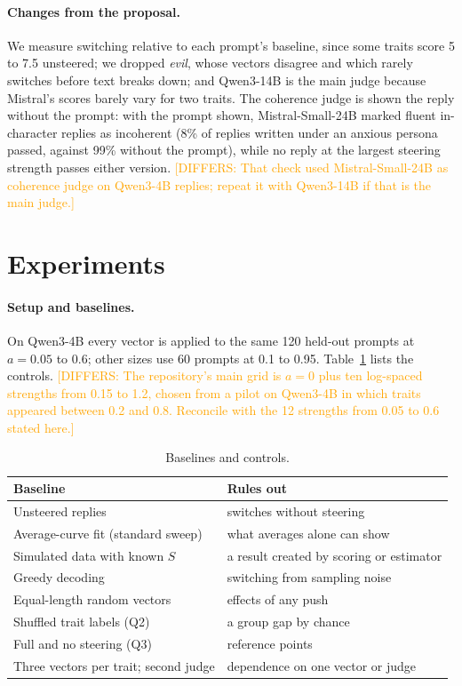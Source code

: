 \documentclass[11pt]{article}
\newcommand{\differ}[1]{\textcolor{orange}{[DIFFERS: #1]}}
\newcommand{\upd}[1]{{\color{blue}#1}}
\begin{document}
\paragraph{Changes from the proposal.} We measure switching relative to each prompt's baseline, since some traits score 5 to 7.5 unsteered; we dropped \emph{evil}, whose vectors disagree and which rarely switches before text breaks down; and Qwen3-14B is the main judge because Mistral's scores barely vary for two traits.
\upd{The coherence judge is shown the reply without the prompt: with the prompt
shown, Mistral-Small-24B marked fluent in-character replies as incoherent (8\%
of replies written under an anxious persona passed, against 99\% without the
prompt), while no reply at the largest steering strength passes either
version.} \differ{That check used Mistral-Small-24B as coherence judge on Qwen3-4B
replies; repeat it with Qwen3-14B if that is the main judge.}

\section{Experiments}

\paragraph{Setup and baselines.} On Qwen3-4B every vector is applied to the same 120 held-out prompts at $a=0.05$ to $0.6$; other sizes use 60 prompts at 0.1 to 0.95. Table~\ref{tab:baselines} lists the controls.
\differ{The repository's main grid is $a=0$ plus ten log-spaced strengths from
0.15 to 1.2, chosen from a pilot on Qwen3-4B in which traits appeared between
0.2 and 0.8. Reconcile with the 12 strengths from 0.05 to 0.6 stated here.}

\begin{table}[t]
\centering
\small
\begin{tabular}{ll}
\toprule
Baseline & Rules out \\
\midrule
Unsteered replies & switches without steering \\
Average-curve fit (standard sweep) & what averages alone can show \\
Simulated data with known $S$ & a result created by scoring or estimator \\
Greedy decoding & switching from sampling noise \\
Equal-length random vectors & effects of any push \\
Shuffled trait labels (Q2) & a group gap by chance \\
Full and no steering (Q3) & reference points \\
Three vectors per trait; second judge & dependence on one vector or judge \\
\bottomrule
\end{tabular}
\caption{Baselines and controls.}
\label{tab:baselines}
\end{table}
\end{document}

